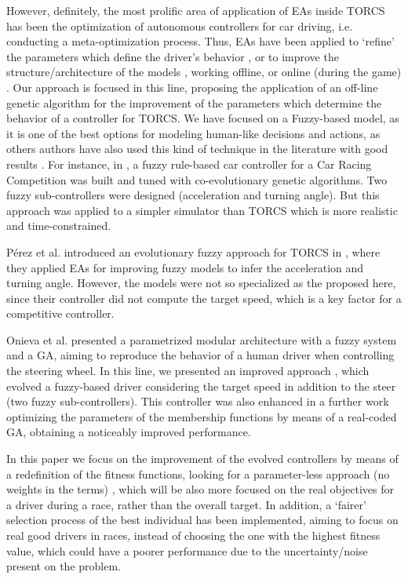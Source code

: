 \documentclass[conference]{IEEEtran}
\begin{document}
However, definitely, the most prolific area of application of EAs
inside TORCS has been the optimization of autonomous controllers for
car driving, i.e. conducting a meta-optimization process. 
Thus, EAs have been applied to `refine' the parameters which define
the driver's behavior \cite{ButzCMAES09,SAES2012}, or to improve the
structure/architecture of the models \cite{SAES2012,neurone}, working
offline, or online (during the game)
\cite{TanOnline08,Cardamone_Online_NN}.
Our approach is focused in this line, proposing the application of an off-line genetic algorithm for the improvement of the parameters which determine the behavior of a controller for TORCS. We have focused on a Fuzzy-based model, as it is one of the best options for modeling human-like decisions and actions, as others authors have also used this kind of technique in the literature with good results \cite{AutopiaDriver2012}. 
For instance, in \cite{Guadarrama2008}, a fuzzy rule-based car controller for a Car Racing Competition was built and tuned with co-evolutionary genetic algorithms. Two fuzzy sub-controllers were designed (acceleration and turning angle). But this approach was applied to a simpler simulator than TORCS which is more realistic and time-constrained. 

P{\'e}rez et al. introduced an evolutionary fuzzy approach for TORCS in \cite{PerezEvolvingFuzzy09}, where they applied EAs for improving fuzzy models to infer the acceleration and turning angle. However, the models were not so specialized as the proposed here, since their controller did not compute the target speed, which is a key factor for a competitive controller. 

Onieva et al. \cite{LFAG} presented a parametrized modular architecture with a fuzzy system and a GA, aiming to reproduce the behavior of a human driver when controlling the steering wheel. In this line, we presented an improved approach \cite{evo17}, which evolved a fuzzy-based driver considering the target speed in addition to the steer (two fuzzy sub-controllers).
This controller was also enhanced in a further work \cite{evo18} optimizing the parameters of the membership functions by means of a real-coded GA, obtaining a noticeably improved performance.

In this paper we focus on the improvement of the evolved controllers by means of a redefinition of the fitness functions, looking for a parameter-less approach (no weights in the terms) \cite{Harik-ParameterLess99}, which will be also more focused on the real objectives for a driver during a race, rather than the overall target. In addition, a `fairer' selection process of the best individual has been implemented, aiming to focus on real good drivers in races, instead of choosing the one with the highest fitness value, which could have a poorer performance due to the uncertainty/noise present on the problem.
\end{document}
